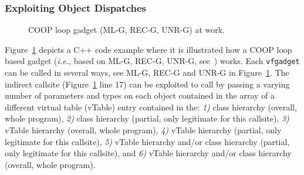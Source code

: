\subsubsection{Exploiting Object Dispatches}
\label{Exploiting Polymorphism Weaknesses}
 \begin{figure}[!h]
   \vspace{-.37cm}
   \centering
\vspace{-2.6cm}
\caption{COOP loop gadget (ML-G, REC-G, UNR-G) at work.}
\label{Code example used to illustrate how a COOP loop gadget works}
\end{figure}
Figure~\ref{Code example used to illustrate how a COOP loop gadget works}
depicts a C++ code example where it is illustrated how a COOP loop based gadget 
(\textit{i.e.,} based on ML-G, REC-G, UNR-G, see~\cite{crane:readactor++}) works.
Each \texttt{vfgadget}  can be called in several ways, see ML-G, REC-G and UNR-G in 
Figure~\ref{Code example used to illustrate how a COOP loop gadget works}.
The indirect callsite (Figure~\ref{Code example used to illustrate how a COOP loop gadget works} line 17) can be exploited 
to call by passing a varying number of parameters and types on each object contained in the array of a different
virtual table (vTable) entry contained in the:
\textit{1)} class hierarchy (overall, whole program),
\textit{2)} class hierarchy (partial, only legitimate for this callsite),
\textit{3)} vTable hierarchy (overall, whole program),
\textit{4)} vTable hierarchy (partial, only legitimate for this callsite),
\textit{5)} vTable hierarchy and/or class hierarchy (partial, only legitimate for this callsite), and
\textit{6)} vTable hierarchy and/or class hierarchy (overall, whole program).
